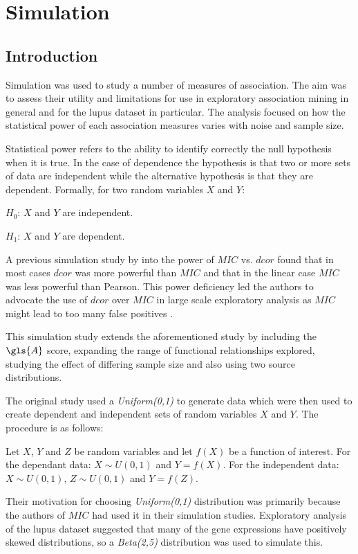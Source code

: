 \documentclass[a4paper, 12pt]{report}
\begin{document}
\chapter{Simulation}

\section{Introduction}
Simulation was used to study a number of measures of association. The aim was to assess their utility and limitations for use in exploratory association mining in general and for the lupus dataset in particular. The analysis focused on how the statistical power of each association measures varies with noise and sample size.

Statistical power refers to the ability to identify correctly the null hypothesis when it is true. In the case of dependence the hypothesis is that two or more sets of data are independent while the alternative hypothesis is that they are dependent. Formally, for two random variables $X$ and $Y$: 
 \newline

$H_0$: $X$ and $Y$ are independent.

$H_1$: $X$ and $Y$ are dependent.
\newline

A previous simulation study by \citet{Tibshirani2011} into the power of $MIC$ vs. $dcor$ found that in most cases $dcor$ was more powerful than $MIC$ and that in the linear case $MIC$ was less powerful than \gls{Pearson}. This power deficiency led the authors to advocate the use of $dcor$ over $MIC$ in large scale exploratory analysis as $MIC$ might lead to too many false positives \cite{Tibshirani2011}. 

This simulation study extends the aforementioned study by including the $\gls{A}$ score, expanding the range of functional relationships explored, studying the effect of differing sample size and also using two source distributions. 

The original study used a \textit{Uniform(0,1)} to generate data which were then used to create dependent and independent sets of random variables $X$ and $Y$. The procedure is as follows: 

Let $X$, $Y$ and $Z$ be random variables and let $f(X)$ be a function of interest. For the dependant data: $X\sim U(0,1)$ and $Y = f(X)$. For the independent data: $X\sim U(0,1)$, $Z\sim U(0,1)$  and $Y = f(Z)$.


Their motivation for choosing \textit{Uniform(0,1)} distribution was primarily because the authors of $MIC$ had used it in their simulation studies\cite{Tibshirani2011, mic2011}. Exploratory analysis of the lupus dataset suggested that many of the gene expressions have positively skewed distributions, so a \textit{Beta(2,5)} distribution was used to simulate this. 
\end{document}
